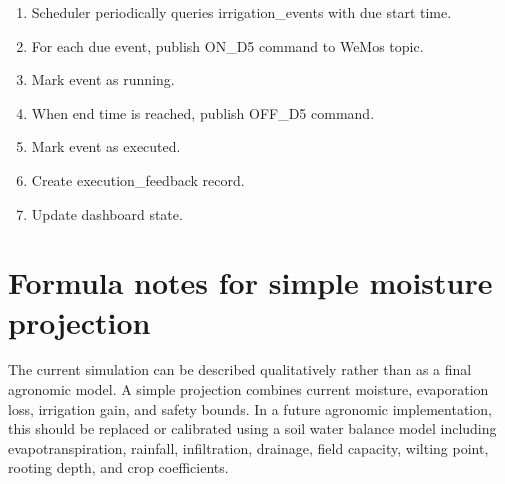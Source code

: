 \begin{enumerate}

\item Scheduler periodically queries irrigation\_events with due start time.

\item For each due event, publish ON\_D5 command to WeMos topic.

\item Mark event as running.

\item When end time is reached, publish OFF\_D5 command.

\item Mark event as executed.

\item Create execution\_feedback record.

\item Update dashboard state.

\end{enumerate}

\section{Formula notes for simple moisture projection}

The current simulation can be described qualitatively rather than as a final agronomic model. A simple projection combines current moisture, evaporation loss, irrigation gain, and safety bounds. In a future agronomic implementation, this should be replaced or calibrated using a soil water balance model including evapotranspiration, rainfall, infiltration, drainage, field capacity, wilting point, rooting depth, and crop coefficients.

